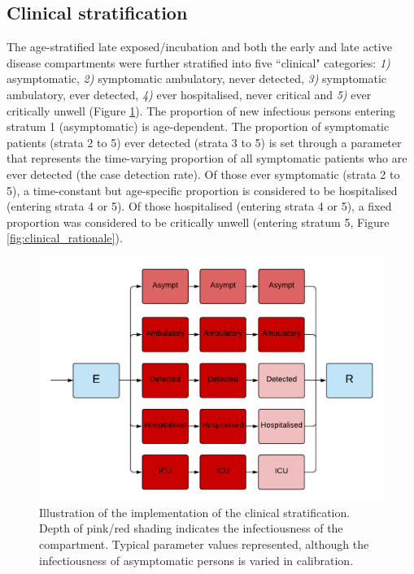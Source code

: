 \subsection{Clinical stratification} \label{clin}
The age-stratified late exposed/incubation and both the early and late active disease compartments were further stratified into five ``clinical" categories: \textit{1)} asymptomatic, \textit{2)} symptomatic ambulatory, never detected, \textit{3)} symptomatic ambulatory, ever detected, \textit{4)} ever hospitalised, never critical and \textit{5)} ever critically unwell (Figure \ref{fig:clinical_strat}).
The proportion of new infectious persons entering stratum 1 (asymptomatic) is age-dependent. The proportion of symptomatic patients (strata 2 to 5) ever detected (strata 3 to 5) is set through a parameter that represents the time-varying proportion of all symptomatic patients who are ever detected (the case detection rate). Of those ever symptomatic (strata 2 to 5), a time-constant but age-specific proportion is considered to be hospitalised (entering strata 4 or 5). Of those hospitalised (entering strata 4 or 5), a fixed proportion was considered to be critically unwell (entering stratum 5, Figure \ref{fig:clinical_rationale}).

\begin{figure}[ht]
    \includegraphics[width=\textwidth]{../covid_19/stratifications/covid_19_clinical_strat.pdf}
    \caption{Illustration of the implementation of the clinical stratification. Depth of pink/red shading indicates the infectiousness of the compartment. Typical parameter values represented, although the infectiousness of asymptomatic persons is varied in calibration.}
    \label{fig:clinical_strat}
\end{figure}


